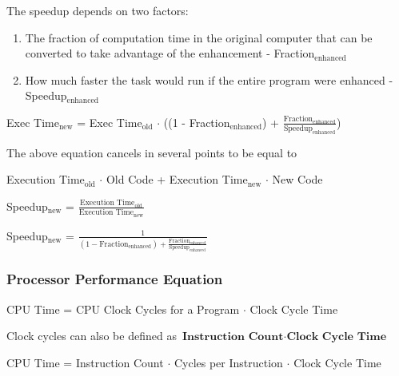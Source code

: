 \documentclass[11pt]{article}
\begin{document}
The speedup depends on two factors:

\begin{enumerate}
    \item The fraction of computation time in the original computer that can be converted to take advantage of the enhancement - Fraction$_{\text{enhanced}}$
    \item How much faster the task would run if the entire program were enhanced - Speedup$_{\text{enhanced}}$
\end{enumerate}

\begin{center}
    {Exec Time}$_\text{new}$ = {Exec Time}$_\text{old}$ $\cdot$ ((1 - Fraction$_\text{enhanced}$) + $\frac{\text{Fraction}_\text{enhanced}}{\text{Speedup}_\text{enhanced}}$)
\end{center}

The above equation cancels in several points to be equal to 

\begin{center}
    Execution Time$_\text{old}$ $\cdot$ Old Code + Execution Time$_\text{new}$ $\cdot$ New Code
\end{center}

\begin{center}
    {Speedup}$_\text{new}$ = $\frac{\text{Execution Time}_\text{old}}{\text{Execution Time}_\text{new}}$
\end{center}

\begin{center}
    {Speedup}$_\text{new}$ = $\frac{1}{(1-\text{Fraction}_\text{enhanced}) + \frac{\text{Fraction}_\text{enhanced}}{\text{Speedup}_\text{enhanced}}}$
\end{center}

\subsubsection{Processor Performance Equation}

\begin{center}
    CPU Time = CPU Clock Cycles for a Program $\cdot$ Clock Cycle Time
\end{center}

Clock cycles can also be defined as $\textbf{Instruction Count} \cdot \textbf{Clock Cycle Time}$

\begin{center}
    CPU Time = Instruction Count $\cdot$ Cycles per Instruction $\cdot$ Clock Cycle Time
\end{center}
\end{document}

